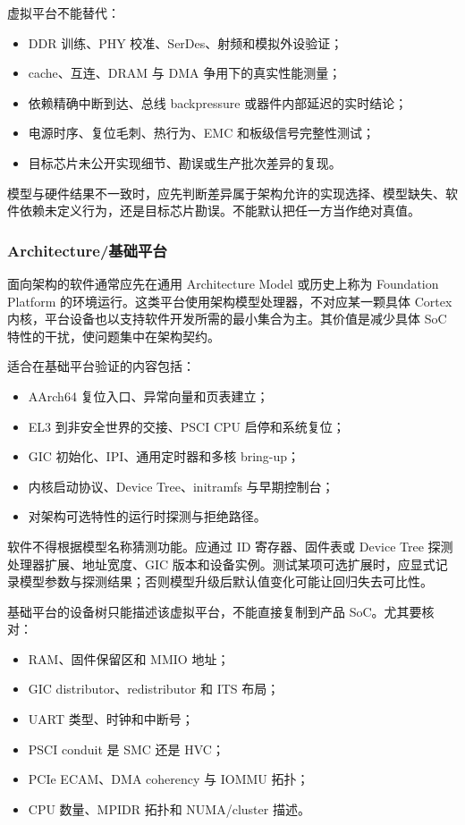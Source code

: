 虚拟平台不能替代：

\begin{itemize}
  \item DDR 训练、PHY 校准、SerDes、射频和模拟外设验证；
  \item cache、互连、DRAM 与 DMA 争用下的真实性能测量；
  \item 依赖精确中断到达、总线 backpressure 或器件内部延迟的实时结论；
  \item 电源时序、复位毛刺、热行为、EMC 和板级信号完整性测试；
  \item 目标芯片未公开实现细节、勘误或生产批次差异的复现。
\end{itemize}

模型与硬件结果不一致时，应先判断差异属于架构允许的实现选择、模型缺失、软件依赖未定义行为，还是目标芯片勘误。不能默认把任一方当作绝对真值。

\subsubsection{Architecture/基础平台}

面向架构的软件通常应先在通用 Architecture Model 或历史上称为 Foundation Platform 的环境运行。这类平台使用架构模型处理器，不对应某一颗具体 Cortex 内核，平台设备也以支持软件开发所需的最小集合为主。其价值是减少具体 SoC 特性的干扰，使问题集中在架构契约。

适合在基础平台验证的内容包括：

\begin{itemize}
  \item AArch64 复位入口、异常向量和页表建立；
  \item EL3 到非安全世界的交接、PSCI CPU 启停和系统复位；
  \item GIC 初始化、IPI、通用定时器和多核 bring-up；
  \item 内核启动协议、Device Tree、initramfs 与早期控制台；
  \item 对架构可选特性的运行时探测与拒绝路径。
\end{itemize}

软件不得根据模型名称猜测功能。应通过 ID 寄存器、固件表或 Device Tree 探测处理器扩展、地址宽度、GIC 版本和设备实例。测试某项可选扩展时，应显式记录模型参数与探测结果；否则模型升级后默认值变化可能让回归失去可比性。

基础平台的设备树只能描述该虚拟平台，不能直接复制到产品 SoC。尤其要核对：

\begin{itemize}
  \item RAM、固件保留区和 MMIO 地址；
  \item GIC distributor、redistributor 和 ITS 布局；
  \item UART 类型、时钟和中断号；
  \item PSCI conduit 是 SMC 还是 HVC；
  \item PCIe ECAM、DMA coherency 与 IOMMU 拓扑；
  \item CPU 数量、MPIDR 拓扑和 NUMA/cluster 描述。
\end{itemize}

